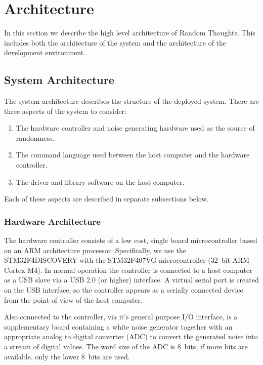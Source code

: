 
\chapter{Architecture}
\label{chapt:architecture}

In this section we describe the high level architecture of Random Thoughts. This includes both
the architecture of the system and the architecture of the development environment.

\section{System Architecture}

The system architecture describes the structure of the deployed system. There are three aspects
of the system to consider:

\begin{enumerate}
\item The hardware controller and noise generating hardware used as the source of randomness.
\item The command language used between the host computer and the hardware controller.
\item The driver and library software on the host computer.
\end{enumerate}

Each of these aspects are described in separate subsections below.

\subsection{Hardware Architecture}

The hardware controller consists of a low cost, single board microcontroller based on an ARM
architecture processor. Specifically, we use the STM32F4DISCOVERY with the STM32F407VG
microcontroller (32~bit ARM Cortex M4). In normal operation the controller is connected to a
host computer as a USB slave via a USB 2.0 (or higher) interface. A virtual serial port is
created on the USB interface, so the controller appears as a serially connected device from the
point of view of the host computer.

Also connected to the controller, via it's general purpose I/O interface, is a supplementary
board containing a white noise generator together with an appropriate analog to digital
converter (ADC) to convert the generated noise into a stream of digital values. The word size of
the ADC is 8~bits; if more bits are available, only the lower 8~bits are used.

